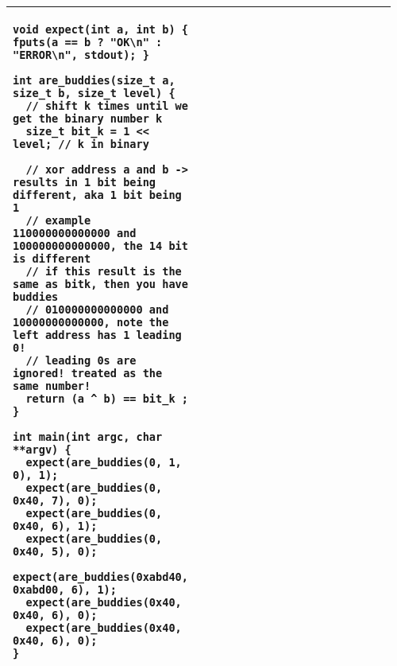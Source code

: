 \documentclass[main.tex,fontsize=8pt,paper=a4,paper=portrait,DIV=calc,]{scrartcl}
\begin{document}
\begin{table}[ht!]
\begin{tabular}{|m{0.2\linewidth}|m{0.755\linewidth}|}
\begin{lstlisting}
void expect(int a, int b) { fputs(a == b ? "OK\n" : "ERROR\n", stdout); }

int are_buddies(size_t a, size_t b, size_t level) {
  // shift k times until we get the binary number k 
  size_t bit_k = 1 << level; // k in binary

  // xor address a and b -> results in 1 bit being different, aka 1 bit being 1
  // example 110000000000000 and 100000000000000, the 14 bit is different
  // if this result is the same as bitk, then you have buddies
  // 010000000000000 and 10000000000000, note the left address has 1 leading 0!
  // leading 0s are ignored! treated as the same number!
  return (a ^ b) == bit_k ;
}

int main(int argc, char **argv) {
  expect(are_buddies(0, 1, 0), 1);
  expect(are_buddies(0, 0x40, 7), 0);
  expect(are_buddies(0, 0x40, 6), 1);
  expect(are_buddies(0, 0x40, 5), 0);
  expect(are_buddies(0xabd40, 0xabd00, 6), 1);
  expect(are_buddies(0x40, 0x40, 6), 0);
  expect(are_buddies(0x40, 0x40, 6), 0);
}
\end{lstlisting}\\
\hline
\end{tabular}
\end{table}
\pagebreak
\end{document}
